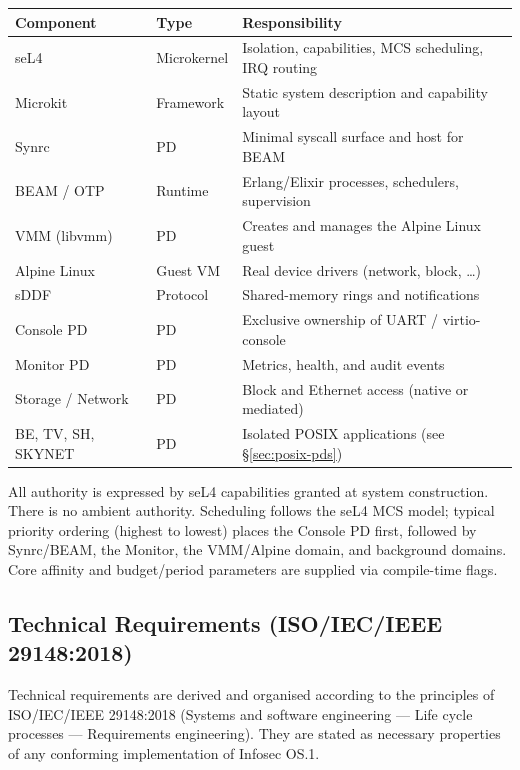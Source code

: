 \documentclass{article}
\begin{document}
\begin{center}
\begin{tabular}{@{}llp{6.5cm}@{}}
\toprule
\textbf{Component} & \textbf{Type} & \textbf{Responsibility} \\
\midrule
seL4               & Microkernel      & Isolation, capabilities, MCS scheduling, IRQ routing \\
Microkit           & Framework        & Static system description and capability layout \\
Synrc              & PD               & Minimal syscall surface and host for BEAM \\
BEAM / OTP         & Runtime          & Erlang/Elixir processes, schedulers, supervision \\
VMM (libvmm)       & PD               & Creates and manages the Alpine Linux guest \\
Alpine Linux       & Guest VM         & Real device drivers (network, block, \ldots) \\
sDDF               & Protocol         & Shared-memory rings and notifications \\
Console PD         & PD               & Exclusive ownership of UART / virtio-console \\
Monitor PD         & PD               & Metrics, health, and audit events \\
Storage / Network  & PD               & Block and Ethernet access (native or mediated) \\
BE, TV, SH, SKYNET & PD               & Isolated POSIX applications (see \S\ref{sec:posix-pds}) \\
\bottomrule
\end{tabular}
\end{center}

All authority is expressed by seL4 capabilities granted at system construction.
There is no ambient authority. Scheduling follows the seL4 MCS model; typical
priority ordering (highest to lowest) places the Console PD first, followed by
Synrc/BEAM, the Monitor, the VMM/Alpine domain, and background domains.
Core affinity and budget/period parameters are supplied via compile-time flags.

\subsection{Technical Requirements (ISO/IEC/IEEE 29148:2018)}
\label{sec:req}

Technical requirements are derived and organised according to the principles of
ISO/IEC/IEEE 29148:2018 (Systems and software engineering --- Life cycle
processes --- Requirements engineering). They are stated as necessary
properties of any conforming implementation of Infosec OS.1.
\end{document}
